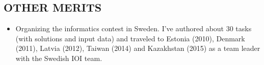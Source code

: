 \documentclass[11pt]{res} %
\begin{document}
\begin{resume}
\section{OTHER MERITS}

\begin{itemize} %
  \item Organizing the informatics contest in Sweden.  I've authored about
    30 tasks (with solutions and input data) and traveled to Estonia (2010),
    Denmark (2011), Latvia (2012), Taiwan (2014) and Kazakhstan (2015) as a
    team leader with the Swedish IOI team.
\end{itemize}

\end{resume}
\end{document}
